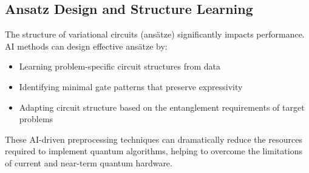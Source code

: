 \subsection{Ansatz Design and Structure Learning}
The structure of variational circuits (ansätze) significantly impacts performance. AI methods can design effective ansätze by:

\begin{itemize}
    \item Learning problem-specific circuit structures from data
    
    \item Identifying minimal gate patterns that preserve expressivity
    
    \item Adapting circuit structure based on the entanglement requirements of target problems
\end{itemize}

These AI-driven preprocessing techniques can dramatically reduce the resources required to implement quantum algorithms, helping to overcome the limitations of current and near-term quantum hardware. 